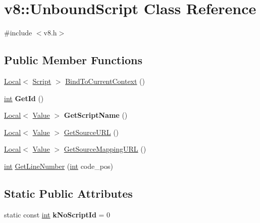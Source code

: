 \hypertarget{classv8_1_1UnboundScript}{}\section{v8\+:\+:Unbound\+Script Class Reference}
\label{classv8_1_1UnboundScript}


{\ttfamily \#include $<$v8.\+h$>$}

\subsection*{Public Member Functions}
\begin{DoxyCompactItemize}
\item 
\mbox{\hyperlink{classv8_1_1Local}{Local}}$<$ \mbox{\hyperlink{classv8_1_1Script}{Script}} $>$ \mbox{\hyperlink{classv8_1_1UnboundScript_aeb86867c13854e1baf0756a46958eca0}{Bind\+To\+Current\+Context}} ()
\item 
\mbox{\label{classv8_1_1UnboundScript_a7ea1ef6cdb32a845b77a01c6113e7262}} 
\mbox{\hyperlink{classint}{int}} {\bfseries Get\+Id} ()
\item 
\mbox{\label{classv8_1_1UnboundScript_ab2fede0349c51fc1b0643153f7c20351}} 
\mbox{\hyperlink{classv8_1_1Local}{Local}}$<$ \mbox{\hyperlink{classv8_1_1Value}{Value}} $>$ {\bfseries Get\+Script\+Name} ()
\item 
\mbox{\hyperlink{classv8_1_1Local}{Local}}$<$ \mbox{\hyperlink{classv8_1_1Value}{Value}} $>$ \mbox{\hyperlink{classv8_1_1UnboundScript_acd0cf7b521821347e9f6ce7b6c007b40}{Get\+Source\+U\+RL}} ()
\item 
\mbox{\hyperlink{classv8_1_1Local}{Local}}$<$ \mbox{\hyperlink{classv8_1_1Value}{Value}} $>$ \mbox{\hyperlink{classv8_1_1UnboundScript_a9568bcd5cd55dd85233926dfd5d8fc27}{Get\+Source\+Mapping\+U\+RL}} ()
\item 
\mbox{\hyperlink{classint}{int}} \mbox{\hyperlink{classv8_1_1UnboundScript_a020ca8bbe6ea2313aeedc993ccac3741}{Get\+Line\+Number}} (\mbox{\hyperlink{classint}{int}} code\+\_\+pos)
\end{DoxyCompactItemize}
\subsection*{Static Public Attributes}
\begin{DoxyCompactItemize}
\item 
\mbox{\label{classv8_1_1UnboundScript_a2d36aeb3abd52d41cf05d1d5f036a0bd}} 
static const \mbox{\hyperlink{classint}{int}} {\bfseries k\+No\+Script\+Id} = 0
\end{DoxyCompactItemize}



